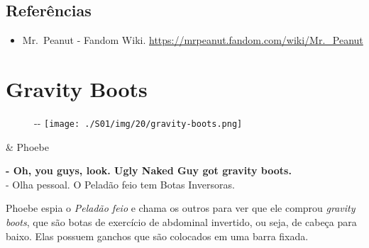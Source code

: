 \hypertarget{referuxeancias}{%
\subsection{Referências}\label{referuxeancias}}

\begin{itemize}
\tightlist
\item
  \sloppy Mr. Peanut - Fandom Wiki. \url{https://mrpeanut.fandom.com/wiki/Mr._Peanut}
\end{itemize}

\hypertarget{gravity-boots}{%
\section{Gravity Boots}\label{gravity-boots}}

\begin{figure}[!ht]
  \begin{adjustwidth}{-\oddsidemargin-1in}{-\rightmargin}
    \centering
    \texttt{[image: ./S01/img/20/gravity-boots.png]}
  \end{adjustwidth}
\end{figure}

\begin{tcolorbox}[enhanced,center upper,
    drop fuzzy shadow southeast, boxrule=0.3pt,
    lower separated=false, breakable,
    colframe=black!30!dialogoBorder,colback=white]
\begin{minipage}[c]{0.16\linewidth}
   & \centering \scriptsize{Phoebe}
\end{minipage}
\hfill
\begin{minipage}[c]{0.8\linewidth}
  \textbf{- Oh, you guys, look. Ugly Naked Guy got gravity boots.}\\
  - Olha pessoal. O Peladão feio tem Botas Inversoras.
\end{minipage}
\end{tcolorbox}

Phoebe espia o \emph{Peladão feio} e chama os outros para ver que ele
comprou \emph{gravity boots}, que são botas de exercício de abdominal
invertido, ou seja, de cabeça para baixo. Elas possuem ganchos que são
colocados em uma barra fixada.

